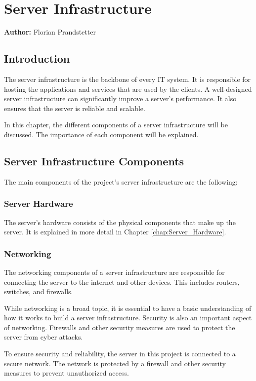 \chapter{Server Infrastructure}
\label{chap:Server_Infrastructure}
\textbf{Author:} Florian Prandstetter

\section{Introduction}

The server infrastructure is the backbone of every IT system. It is responsible for hosting the applications and services that are used by the clients.
A well-designed server infrastructure can significantly improve a server's performance. It also ensures that the server is reliable and scalable.

In this chapter, the different components of a server infrastructure will be discussed. The importance of each component will be explained.

\section{Server Infrastructure Components}

The main components of the project's server infrastructure are the following:

\subsection{Server Hardware}

The server's hardware consists of the physical components that make up the server. 
It is explained in more detail in Chapter \ref{chap:Server_Hardware}.

\subsection{Networking}

The networking components of a server infrastructure are responsible for connecting the server to the internet and other devices.
This includes routers, switches, and firewalls.

While networking is a broad topic, it is essential to have a basic understanding of how it works to build a server infrastructure.
Security is also an important aspect of networking. Firewalls and other security measures are used to protect the server from cyber attacks.   

To ensure security and reliability, the server in this project is connected to a secure network. The network is protected by a firewall and other security measures to prevent unauthorized access.

